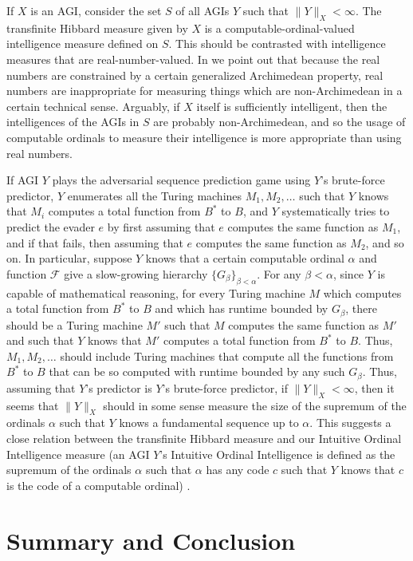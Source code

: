 \documentclass{article}
\begin{document}
If $X$ is an AGI, consider the set $S$ of all AGIs $Y$ such that $\|Y\|_X<\infty$.
The transfinite Hibbard measure given by $X$ is a computable-ordinal-valued intelligence
measure defined on $S$. This should be contrasted with intelligence measures that
are real-number-valued. In \cite{alexander2020archimedean} we point out that because
the real numbers are constrained by a certain generalized Archimedean property,
real numbers are inappropriate for measuring things which are non-Archimedean in a certain
technical sense. Arguably, if $X$ itself is sufficiently intelligent, then
the intelligences of the AGIs in $S$ are probably non-Archimedean, and so the usage of
computable ordinals to measure their intelligence is more appropriate than using real numbers.

If AGI $Y$ plays the adversarial sequence prediction game using $Y$'s brute-force
predictor, $Y$ enumerates all the Turing machines $M_1,M_2,\ldots$ such that $Y$ knows that
$M_i$ computes a total function from $B^*$ to $B$, and $Y$ systematically tries to
predict the evader $e$ by first assuming that $e$ computes the same function as
$M_1$, and if that fails, then assuming that $e$ computes the same function as
$M_2$, and so on. In particular, suppose $Y$ knows that a certain computable ordinal
$\alpha$ and function $\mathcal F$ give a slow-growing hierarchy
$\{G_\beta\}_{\beta<\alpha}$. For any $\beta<\alpha$,
since $Y$ is capable of mathematical reasoning, for every Turing machine $M$
which computes a total function from $B^*$ to $B$ and which has runtime bounded by
$G_\beta$, there should be a Turing machine $M'$ such that $M$ computes the same
function as $M'$ and such that $Y$ knows that $M'$ computes a total function from $B^*$
to $B$. Thus, $M_1,M_2,\ldots$ should include Turing machines that compute all the
functions from $B^*$ to $B$ that can be so computed with runtime bounded by any such
$G_\beta$. Thus, assuming that $Y$'s predictor is $Y$'s brute-force predictor, if
$\|Y\|_X<\infty$, then it seems that $\|Y\|_X$ should in some sense measure the size
of the supremum of the ordinals $\alpha$ such that $Y$ knows a fundamental sequence up
to $\alpha$. This suggests a close relation between the transfinite Hibbard measure and
our Intuitive Ordinal Intelligence measure (an AGI $Y$'s Intuitive Ordinal Intelligence is
defined as the supremum of the ordinals $\alpha$ such that $\alpha$ has any code
$c$ such that $Y$ knows that $c$ is the code of a computable ordinal)
\cite{ioi1} \cite{ioi2}.

\section{Summary and Conclusion}
\label{conclusionsection}
\end{document}

